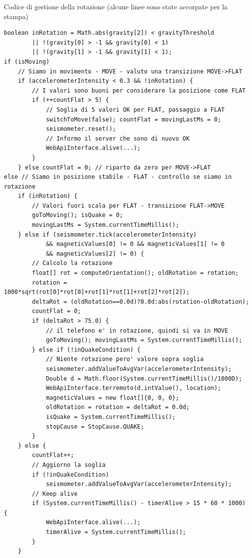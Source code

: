 \documentclass[a4paper,10pt]{memoir}
\begin{document}
\begin{listing}[H]
\caption{Codice di gestione della rotazione (alcune linee sono state accorpate per la stampa)}
\begin{verbatim}
boolean inRotation = Math.abs(gravity[2]) < gravityThreshold
		|| !(gravity[0] > -1 && gravity[0] < 1)
		|| !(gravity[1] > -1 && gravity[1] < 1);
if (isMoving)
	// Siamo in movimento - MOVE - valuto una transizione MOVE->FLAT
	if (accelerometerIntensity < 0.3 && !inRotation) {
		// I valori sono buoni per considerare la posizione come FLAT
		if (++countFlat > 5) {
			// Soglia di 5 valori OK per FLAT, passaggio a FLAT
			switchToMove(false); countFlat = movingLastMs = 0;
			seismometer.reset();
			// Informo il server che sono di nuovo OK
			WebApiInterface.alive(...);
		}
	} else countFlat = 0; // riparto da zero per MOVE->FLAT
else // Siamo in posizione stabile - FLAT - controllo se siamo in rotazione
	if (inRotation) {
		// Valori fuori scala per FLAT - transizione FLAT->MOVE
		goToMoving(); isQuake = 0;
		movingLastMs = System.currentTimeMillis();
	} else if (seismometer.tick(accelerometerIntensity)
			&& magneticValues[0] != 0 && magneticValues[1] != 0
			&& magneticValues[2] != 0) {
		// Calcolo la rotazione
		float[] rot = computeOrientation(); oldRotation = rotation;
		rotation = 1000*sqrt(rot[0]*rot[0]+rot[1]*rot[1]+rot[2]*rot[2]);
		deltaRot = (oldRotation==0.0d)?0.0d:abs(rotation-oldRotation);
		countFlat = 0;
		if (deltaRot > 75.0) {
			// il telefono e' in rotazione, quindi si va in MOVE
			goToMoving(); movingLastMs = System.currentTimeMillis();
		} else if (!inQuakeCondition) {
			// Niente rotazione pero' valore sopra soglia
			seismometer.addValueToAvgVar(accelerometerIntensity);
			Double d = Math.floor(System.currentTimeMillis()/1000D);
			WebApiInterface.terremoto(d.intValue(), location);
			magneticValues = new float[]{0, 0, 0};
			oldRotation = rotation = deltaRot = 0.0d;
			isQuake = System.currentTimeMillis();
			stopCause = StopCause.QUAKE;
		}
	} else {
		countFlat++;
		// Aggiorno la soglia
		if (!inQuakeCondition)
			seismometer.addValueToAvgVar(accelerometerIntensity);
		// Keep alive
		if (System.currentTimeMillis() - timerAlive > 15 * 60 * 1000) {
			WebApiInterface.alive(...);
			timerAlive = System.currentTimeMillis();
		}
	}
\end{verbatim}
\end{listing}
\end{document}
